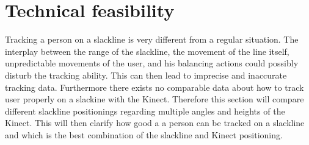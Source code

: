 \section{Technical feasibility}\label{5_3_technicalFeasibility}
Tracking a person on a slackline is very different from a regular situation. The interplay between the range of the slackline, the movement of the line itself, unpredictable movements of the user, and his balancing actions could possibly disturb the tracking ability. This can then lead to imprecise and inaccurate tracking data. Furthermore there exists no comparable data about how to track user properly on a slackine with the Kinect. Therefore this section will compare different slackline positionings regarding multiple angles and heights of the Kinect. This will then clarify how good a a person can be tracked on a slackline and which is the best combination of the slackline and Kinect positioning.



